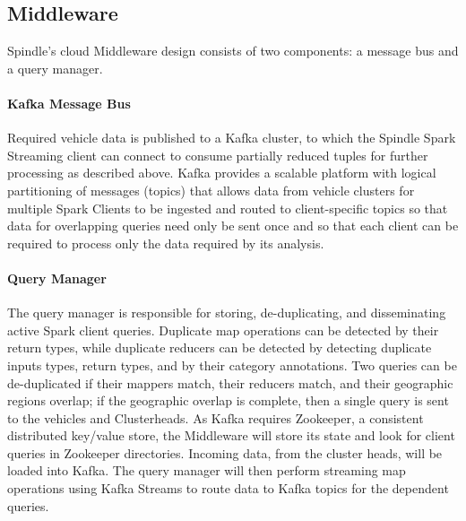 \documentclass{thesis}
\begin{document}
\subsection{Middleware}
    Spindle's cloud Middleware design consists of two components: a message bus and a query manager.
    \paragraph{Kafka Message Bus}
        Required vehicle data is published to a Kafka cluster, to which the Spindle Spark Streaming client can
        connect to consume partially reduced tuples for further processing as described above. Kafka provides
        a scalable platform with logical partitioning of messages (topics) that allows data from vehicle clusters
        for multiple Spark Clients to be ingested and routed to client-specific topics so that data for overlapping
        queries need only be sent once and so that each client can be required to process only the data required by
        its analysis.
    \paragraph{Query Manager}
        The query manager is responsible for storing, de-duplicating, and disseminating active Spark client queries.
        Duplicate map operations can be detected by their return types, while duplicate reducers can be detected
        by detecting duplicate inputs types, return types, and by their category annotations. Two queries can be
        de-duplicated if their mappers match, their reducers match, and their geographic regions overlap; if the
        geographic overlap is complete, then a single query is sent to the vehicles and Clusterheads.
        As Kafka requires Zookeeper, a consistent distributed key/value store, the Middleware will store its
        state and look for client queries in Zookeeper directories.
        Incoming data, from the cluster heads, will be loaded into Kafka. The query manager will then perform
        streaming map operations using Kafka Streams to route data to Kafka topics for the dependent queries.
\end{document}
